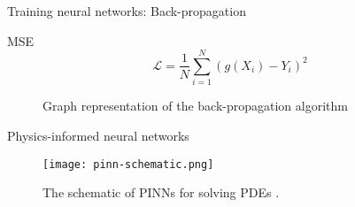 \begin{frame}[fragile]{Training neural networks: Back-propagation}
    \begin{block}{\gls{MSE}}
        \begin{equation*}
            \mathcal{L} = \frac{1}{N} \sum_{i=1}^N (g(X_i) - Y_i)^2
        \end{equation*}
    \end{block}
    \begin{figure}[h]
        \centering
        \caption{Graph representation of the back-propagation algorithm}
        \label{fig:multi-layer-perceptron-backpropagation}
    \end{figure}
\end{frame}

\begin{frame}{Physics-informed neural networks}
    \begin{figure}[h]
        \centering
        \texttt{[image: pinn-schematic.png]}
        \caption{The schematic of PINNs for solving PDEs \cite{guoSolvingPartialDifferential2020}.}
        \label{fig:pinn-schematic}
    \end{figure}
\end{frame}

